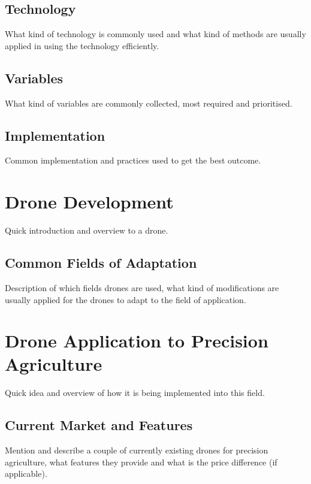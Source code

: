 \documentclass[conference]{IEEEtran}
\begin{document}
\subsection{Technology}

    What kind of technology is commonly used and what kind of methods are usually applied in using the technology efficiently.
    
\subsection{Variables}

    What kind of variables are commonly collected, most required and prioritised.
    
\subsection{Implementation}

    Common implementation and practices used to get the best outcome.
    
\section{Drone Development}

    Quick introduction and overview to a drone.

\subsection{Common Fields of Adaptation}

    Description of which fields drones are used, what kind of modifications are usually applied for the drones to adapt to the field of application.
    
\section{Drone Application to Precision Agriculture}

    Quick idea and overview of how it is being implemented into this field.
    
\subsection{Current Market and Features}

    Mention and describe a couple of currently existing drones for precision agriculture, what features they provide and what is the price difference (if applicable).
\end{document}
